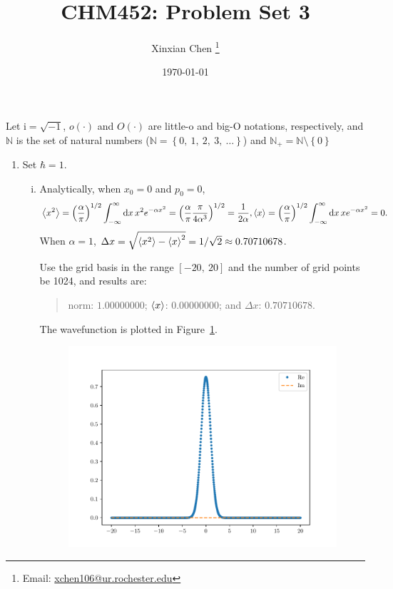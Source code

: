 \documentclass{article}
\title{CHM452: Problem Set 3}
\author{Xinxian Chen%
\footnote{Email: \href{mailto:xchen106@ur.rochester.edu}{xchen106@ur.rochester.edu}}}
\date{\today}
\newcommand{\iu}{\ensuremath{\mathrm{i}}}
\newcommand{\set}[1]{\ensuremath{\left\{{#1}\right\}}}
\begin{document}
\maketitle

Let $\iu = \sqrt{-1}$, $o(\cdot)$ and $O(\cdot)$ are little-o and big-O notations, respectively, and $\mathbb{N}$ is the set of natural numbers ($\mathbb{N} = \set{0,\ 1,\ 2,\ 3,\ \ldots}$) and $\mathbb{N}_+ = \mathbb{N}\setminus\set{0}$

\begin{enumerate}[1.]
  \item Set $\hbar = 1$.
  \begin{enumerate}[(i)]
    \item Analytically, when $x_0 = 0$ and $p_0 = 0$,
    \begin{align*}
      \ev{x^2} &= \qty(\frac{\alpha}{\pi})^{1/2}\int_{-\infty}^{\infty} \dd{x}x^2 e^{-\alpha x^2} 
      = \qty(\frac{\alpha}{\pi} \frac{\pi}{4\alpha^3})^{1/2}
      = \frac{1}{{2\alpha}},
      \ev{x} = \qty(\frac{\alpha}{\pi})^{1/2}\int_{-\infty}^{\infty} \dd{x}x e^{-\alpha x^2} 
      = 0.
    \end{align*}
    When $\alpha = 1$, $\Delta x = \sqrt{\ev{x^2} - \ev{x}^2} = 1/\sqrt{2} \approx 0.70710678$.
  
    Use the grid basis in the range $[-20,\ 20]$ and the number of grid points be 1024, and results are:
    \begin{quotation}
      norm: $1.00000000$; $\ev{x}$: $0.00000000$; and $\Delta x$: $0.70710678$.
    \end{quotation}
    The wavefunction is plotted in Figure~\ref{fig:1-1}.
    \begin{figure}[H]
      \centering
      \includegraphics[width=0.6\linewidth]{q1-1.pdf}
      \caption{}
      \label{fig:1-1}
    \end{figure}


\end{enumerate}
\end{enumerate}
\end{document}
